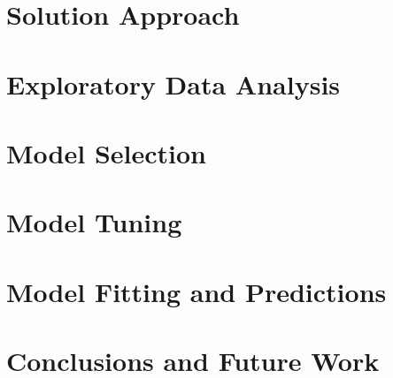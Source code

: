 \documentclass[10pt,a4paper]{article}
\begin{document}
\section{Solution Approach}

\section{Exploratory Data Analysis}\label{sec:eda}

\section{Model Selection}

\section{Model Tuning}

\section{Model Fitting and Predictions}

\section{Conclusions and Future Work}
\end{document}
